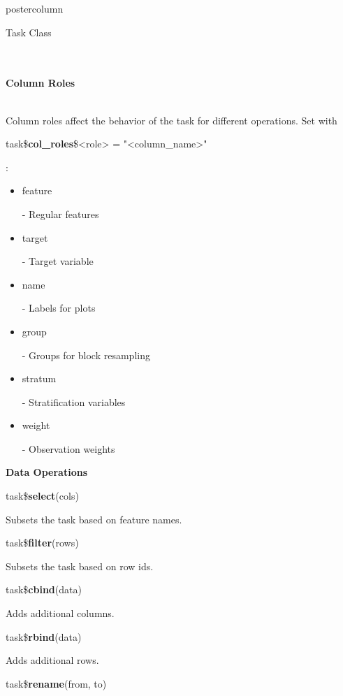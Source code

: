 \documentclass{beamer}
\newcommand{\codeinline}[1]{\begin{codeboxinline}#1\end{codeboxinline}}
\newcommand{\sectionheading}[1]{{\color{mlrblue}\large\raggedright\textbf{#1}}\vspace{1em}}
\begin{document}
\begin{frame}[fragile]{}
\begin{columns}
\begin{column}{.245\textwidth}
\begin{beamercolorbox}[center]{postercolumn}
\begin{minipage}{.98\textwidth}
{\begin{myblock}{Task Class}
							\\
							\vspace{1em}
							\\
							\vspace{1em}
							\\
                            \sectionheading{Column Roles}
                            \\
							Column roles affect the behavior of the task for different operations. Set with \codeinline{task\$\textbf{col\_roles}\$<role> = "<column\_name>"}:
							\\
							\begin{itemize}
								\item \codeinline{feature} - Regular features
								\item \codeinline{target} - Target variable
								\item \codeinline{name} - Labels for plots
								\item \codeinline{group} -  Groups for block resampling
								\item \codeinline{stratum} - Stratification variables
								\item \codeinline{weight} - Observation weights
							\end{itemize}
							\vspace{1em}
                            \sectionheading{Data Operations}
                            \begin{codebox}
								task\$\textbf{select}(cols)
							\end{codebox}
							Subsets the task based on feature names.
							\\
							\begin{codebox}
								task\$\textbf{filter}(rows)
							\end{codebox}
							Subsets the task based on row ids.
							\\
							\begin{codebox}
								task\$\textbf{cbind}(data)
							\end{codebox}
							Adds additional columns.
							\\
							\begin{codebox}
								task\$\textbf{rbind}(data)
							\end{codebox}
							Adds additional rows.
							\\
							\begin{codebox}
								task\$\textbf{rename}(from, to)
							\end{codebox}

\end{myblock}}
\end{minipage}
\end{beamercolorbox}
\end{column}
\end{columns}
\end{frame}
\end{document}
